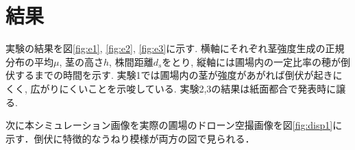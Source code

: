 \documentclass[twocolumn]{jarticle}
\begin{document}
\section{結果}
実験の結果を図\ref{fig:e1}, \ref{fig:e2}, \ref{fig:e3}に示す. 横軸にそれぞれ茎強度生成の正規分布の平均$\mu$, 茎の高さ$h$, 株間距離$d_s$をとり, 縦軸には圃場内の一定比率の穂が倒伏するまでの時間を示す.
実験1では圃場内の茎が強度があがれば倒伏が起きにくく, 広がりにくいことを示唆している.
実験2,3の結果は紙面都合で発表時に譲る.

次に本シミュレーション画像を実際の圃場のドローン空撮画像を図\ref{fig:disp1}に示す．倒伏に特徴的なうねり模様が両方の図で見られる．





\end{document}
